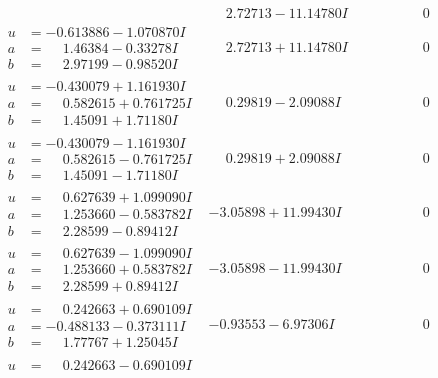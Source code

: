 \documentclass[1p]{elsarticle_modified}
\theoremstyle{definition}
\begin{document}
$$\begin{array}{c|c|c}
 & \phantom{-}2.72713 - 11.14780 I & \phantom{-0.000000 } 0 \\ \hline\begin{aligned}
u &= -0.613886 - 1.070870 I \\
a &= \phantom{-}1.46384 - 0.33278 I \\
b &= \phantom{-}2.97199 - 0.98520 I\end{aligned}
 & \phantom{-}2.72713 + 11.14780 I & \phantom{-0.000000 } 0 \\ \hline\begin{aligned}
u &= -0.430079 + 1.161930 I \\
a &= \phantom{-}0.582615 + 0.761725 I \\
b &= \phantom{-}1.45091 + 1.71180 I\end{aligned}
 & \phantom{-}0.29819 - 2.09088 I & \phantom{-0.000000 } 0 \\ \hline\begin{aligned}
u &= -0.430079 - 1.161930 I \\
a &= \phantom{-}0.582615 - 0.761725 I \\
b &= \phantom{-}1.45091 - 1.71180 I\end{aligned}
 & \phantom{-}0.29819 + 2.09088 I & \phantom{-0.000000 } 0 \\ \hline\begin{aligned}
u &= \phantom{-}0.627639 + 1.099090 I \\
a &= \phantom{-}1.253660 - 0.583782 I \\
b &= \phantom{-}2.28599 - 0.89412 I\end{aligned}
 & -3.05898 + 11.99430 I & \phantom{-0.000000 } 0 \\ \hline\begin{aligned}
u &= \phantom{-}0.627639 - 1.099090 I \\
a &= \phantom{-}1.253660 + 0.583782 I \\
b &= \phantom{-}2.28599 + 0.89412 I\end{aligned}
 & -3.05898 - 11.99430 I & \phantom{-0.000000 } 0 \\ \hline\begin{aligned}
u &= \phantom{-}0.242663 + 0.690109 I \\
a &= -0.488133 - 0.373111 I \\
b &= \phantom{-}1.77767 + 1.25045 I\end{aligned}
 & -0.93553 - 6.97306 I & \phantom{-0.000000 } 0 \\ \hline\begin{aligned}
u &= \phantom{-}0.242663 - 0.690109 I \\

\end{aligned}
\end{array}$$
\end{document}
